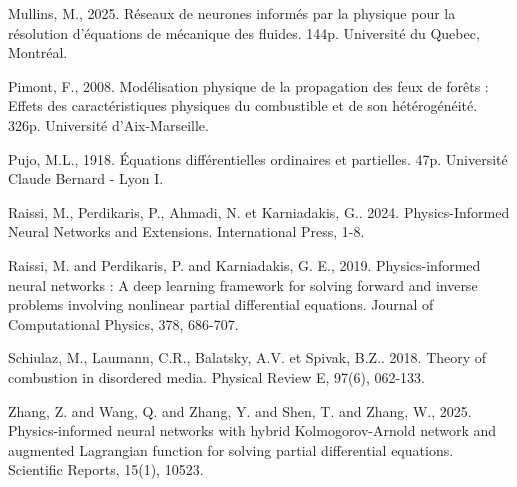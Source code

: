 \documentclass[12pt, oneside]{report} %
\theoremstyle{definition}
\theoremstyle{remark}
\begin{document}
\begin{enumerate}[label={[\arabic*]}, leftmargin=*, align=left, nosep]
		\item Mullins, M., 2025. Réseaux de neurones informés par la physique pour la
		résolution d’équations de mécanique des fluides. 144p. Université du Quebec, Montréal.
		\item Pimont, F., 2008. Modélisation physique de la propagation des feux de forêts : Effets des caractéristiques physiques du combustible et de son hétérogénéité. 326p. Université d’Aix-Marseille.  
		\item Pujo, M.L., 1918. Équations différentielles ordinaires et partielles. 47p. Université Claude Bernard - Lyon I.
		\item Raissi, M., Perdikaris, P., Ahmadi, N. et Karniadakis, G.. 2024. Physics-Informed Neural Networks and Extensions. International Press, 1-8. 
		\item Raissi, M. and Perdikaris, P. and Karniadakis, G. E., 2019. Physics-informed neural networks : A deep learning framework for solving forward and inverse problems involving nonlinear partial differential equations. Journal of Computational Physics, 378, 686-707.
		\item Schiulaz, M., Laumann, C.R., Balatsky, A.V. et Spivak, B.Z.. 2018. Theory of combustion in disordered media. Physical Review E, 97(6), 062-133.
		\item Zhang, Z. and Wang, Q. and Zhang, Y. and Shen, T. and Zhang, W., 2025. Physics-informed neural networks with hybrid Kolmogorov-Arnold network and augmented Lagrangian function for solving partial differential equations. Scientific Reports, 15(1), 10523. 
	\end{enumerate}
	
	
	
	
	\appendix
\end{document}
